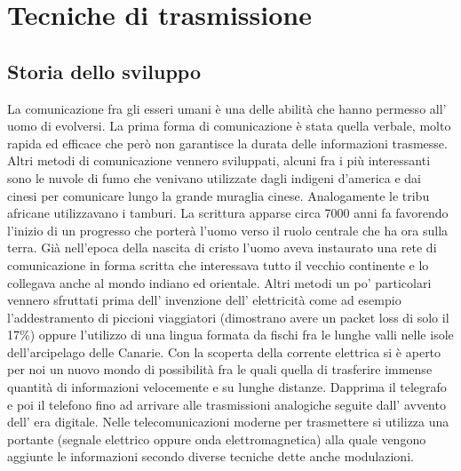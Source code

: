 \chapter{Tecniche di trasmissione}
\label{cha:intro}
\section{Storia dello sviluppo}
\label{sec:context}
 La comunicazione fra gli esseri umani è una delle abilità che hanno permesso all' uomo di evolversi. La prima forma di comunicazione è stata quella verbale, molto rapida ed efficace che però non garantisce la durata delle informazioni trasmesse. Altri metodi di comunicazione vennero sviluppati, alcuni fra i più interessanti sono le nuvole di fumo che venivano utilizzate dagli indigeni d'america e dai cinesi per comunicare lungo la grande muraglia cinese. Analogamente le tribu africane utilizzavano i tamburi. La scrittura apparse circa 7000 anni fa favorendo l'inizio di un progresso che porterà l'uomo verso il ruolo centrale che ha ora sulla terra. Già nell'epoca della nascita di cristo l'uomo aveva instaurato una rete di comunicazione in forma scritta che interessava tutto il vecchio continente e lo collegava anche al mondo indiano ed orientale. Altri metodi un po' particolari vennero sfruttati prima dell' invenzione dell' elettricità come ad esempio l'addestramento di piccioni viaggiatori (dimostrano avere un packet loss di solo il 17\%) oppure l'utilizzo di una lingua formata da fischi fra le lunghe valli nelle isole dell'arcipelago delle Canarie.
Con la scoperta della corrente elettrica si è aperto per noi un nuovo mondo di possibilità fra le quali quella di trasferire immense quantità di informazioni velocemente e su lunghe distanze. Dapprima il telegrafo e poi il telefono fino ad arrivare alle trasmissioni analogiche seguite dall' avvento dell' era digitale. Nelle telecomunicazioni moderne per trasmettere si utilizza una portante (segnale elettrico oppure onda elettromagnetica) alla quale vengono aggiunte le informazioni secondo diverse tecniche dette anche modulazioni.


